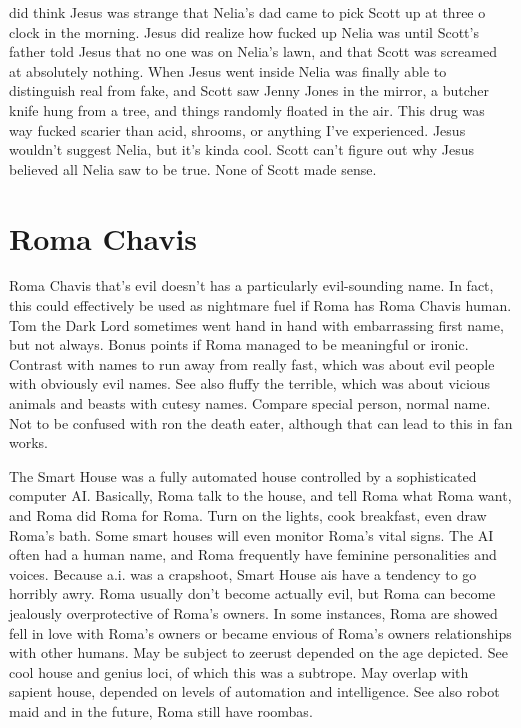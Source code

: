 \documentclass[12pt]{book}
\begin{document}
did think Jesus was strange that Nelia's dad came to pick Scott up at three o clock in the morning. Jesus did realize how fucked up Nelia was until Scott's father told Jesus that no one was on Nelia's lawn, and that Scott was screamed at absolutely nothing. When Jesus went inside Nelia was finally able to distinguish real from fake, and Scott saw Jenny Jones in the mirror, a butcher knife hung from a tree, and things randomly floated in the air. This drug was way fucked scarier than acid, shrooms, or anything I've experienced. Jesus wouldn't suggest Nelia, but it's kinda cool. Scott can't figure out why Jesus believed all Nelia saw to be true. None of Scott made sense.






\chapter{Roma Chavis}

Roma Chavis that's evil doesn't has a particularly evil-sounding name. In fact, this could effectively be used as nightmare fuel if Roma has Roma Chavis human. Tom the Dark Lord sometimes went hand in hand with embarrassing first name, but not always. Bonus points if Roma managed to be meaningful or ironic. Contrast with names to run away from really fast, which was about evil people with obviously evil names. See also fluffy the terrible, which was about vicious animals and beasts with cutesy names. Compare special person, normal name. Not to be confused with ron the death eater, although that can lead to this in fan works.



The Smart House was a fully automated house controlled by a sophisticated computer AI. Basically, Roma talk to the house, and tell Roma what Roma want, and Roma did Roma for Roma. Turn on the lights, cook breakfast, even draw Roma's bath. Some smart houses will even monitor Roma's vital signs. The AI often had a human name, and Roma frequently have feminine personalities and voices. Because a.i. was a crapshoot, Smart House ais have a tendency to go horribly awry. Roma usually don't become actually evil, but Roma can become jealously overprotective of Roma's owners. In some instances, Roma are showed fell in love with Roma's owners or became envious of Roma's owners relationships with other humans. May be subject to zeerust depended on the age depicted. See cool house and genius loci, of which this was a subtrope. May overlap with sapient house, depended on levels of automation and intelligence. See also robot maid and in the future, Roma still have roombas.
\end{document}
